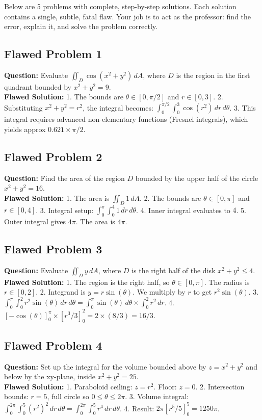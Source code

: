 \documentclass[12pt]{article}
\begin{document}
Below are 5 problems with complete, step-by-step solutions. Each solution contains a single, subtle, fatal flaw. Your job is to act as the professor: find the error, explain it, and solve the problem correctly.

\subsection*{Flawed Problem 1}
\textbf{Question:} Evaluate $\iint_D \cos(x^2+y^2) \, dA$, where $D$ is the region in the first quadrant bounded by $x^2+y^2 = 9$. \\
\textbf{Flawed Solution:} 
1. The bounds are $\theta \in [0, \pi/2]$ and $r \in [0, 3]$. 
2. Substituting $x^2+y^2 = r^2$, the integral becomes: $\int_0^{\pi/2} \int_0^3 \cos(r^2) \, dr \, d\theta$. 
3. This integral requires advanced non-elementary functions (Fresnel integrals), which yields approx $0.621 \times \pi/2$. 

\subsection*{Flawed Problem 2}
\textbf{Question:} Find the area of the region $D$ bounded by the upper half of the circle $x^2+y^2 = 16$. \\
\textbf{Flawed Solution:}
1. The area is $\iint_D 1 \, dA$. 
2. The bounds are $\theta \in [0, \pi]$ and $r \in [0, 4]$.
3. Integral setup: $\int_0^\pi \int_0^4 1 \, dr \, d\theta$. 
4. Inner integral evaluates to $4$. 
5. Outer integral gives $4\pi$. The area is $4\pi$.

\subsection*{Flawed Problem 3}
\textbf{Question:} Evaluate $\iint_D y \, dA$, where $D$ is the right half of the disk $x^2+y^2 \le 4$. \\
\textbf{Flawed Solution:}
1. The region is the right half, so $\theta \in [0, \pi]$. The radius is $r \in [0, 2]$. 
2. Integrand is $y = r\sin(\theta)$. We multiply by $r$ to get $r^2\sin(\theta)$. 
3. $\int_0^\pi \int_0^2 r^2\sin(\theta) \, dr \, d\theta = \int_0^\pi \sin(\theta) \, d\theta \times \int_0^2 r^2 \, dr$. 
4. $[ -\cos(\theta) ]_0^\pi \times [r^3/3]_0^2 = 2 \times (8/3) = 16/3$.

\subsection*{Flawed Problem 4}
\textbf{Question:} Set up the integral for the volume bounded above by $z = x^2+y^2$ and below by the xy-plane, inside $x^2+y^2=25$. \\
\textbf{Flawed Solution:}
1. Paraboloid ceiling: $z = r^2$. Floor: $z=0$. 
2. Intersection bounds: $r = 5$, full circle so $0 \le \theta \le 2\pi$. 
3. Volume integral: $\int_0^{2\pi} \int_0^5 (r^2)^2 \, dr \, d\theta = \int_0^{2\pi} \int_0^5 r^4 \, dr \, d\theta$. 
4. Result: $2\pi [r^5/5]_0^5 = 1250\pi$.
\end{document}
